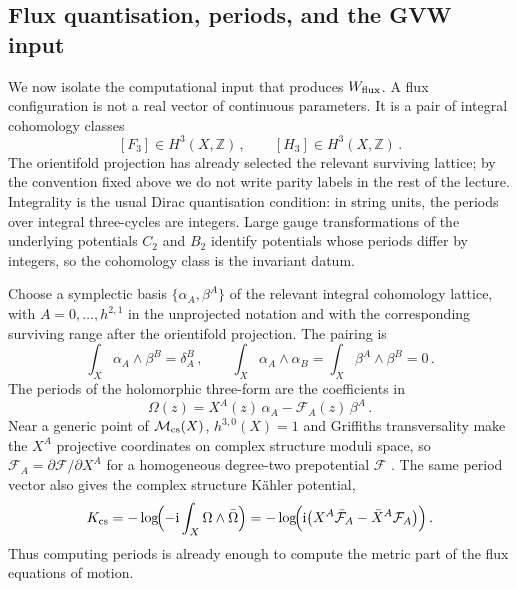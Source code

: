 \subsection{Flux quantisation, periods, and the GVW input}
\label{ssec:L2-flux-period-setup}\label{ssec:L2-periods}

We now isolate the computational input that produces $W_{\rm flux}$.
A flux configuration is not a real vector of continuous parameters. It
is a pair of integral cohomology classes
\begin{equation}\label{eq:flux-quant}
    [F_3]\in H^3(X,\mathbb Z)\, ,
    \qquad
    [H_3]\in H^3(X,\mathbb Z)\, .
\end{equation}
The orientifold projection has already selected the relevant surviving
lattice; by the convention fixed above we do not write parity labels
in the rest of the lecture.  Integrality is the usual Dirac
quantisation condition: in string units, the periods over integral
three-cycles are integers.  Large gauge transformations of the
underlying potentials $C_2$ and $B_2$ identify potentials whose
periods differ by integers, so the cohomology class is the invariant
datum.

Choose a symplectic basis $\{\alpha_A,\beta^A\}$ of the relevant
integral cohomology lattice, with $A=0,\ldots,h^{2,1}$ in the
unprojected notation and with the corresponding surviving range after
the orientifold projection.  The pairing is
\begin{equation}\label{eq:L2-symplectic-pairing}
    \int_X\alpha_A\wedge\beta^B
    =
    \delta_A^B\, ,
    \qquad
    \int_X\alpha_A\wedge\alpha_B
    =
    \int_X\beta^A\wedge\beta^B
    =
    0\, .
\end{equation}
The periods of the holomorphic three-form are the coefficients in
\begin{equation}\label{eq:periods}
    \Omega(z)
    =
    X^A(z)\,\alpha_A-\mathcal F_A(z)\,\beta^A\, .
\end{equation}
Near a generic point of $\mathcal M_{\rm cs}(X)$, $h^{3,0}(X)=1$
and Griffiths transversality make the $X^A$ projective coordinates on
complex structure moduli space, so
$\mathcal F_A=\partial\mathcal F/\partial X^A$ for a homogeneous
degree-two prepotential $\mathcal F$ \cite{Candelas:1990rm}.  The
same period vector also gives the complex structure K\"ahler
potential,
\begin{equation}\label{eq:K-cs}
    K_{\rm cs}
    =
    -\log\!\Bigl(-\mathrm{i}\int_X\Omega\wedge\bar\Omega\Bigr)
    =
    -\log\!\Bigl(\mathrm{i}\bigl(X^A\bar{\mathcal F}_A
    -\bar X^A\mathcal F_A\bigr)\Bigr)\, .
\end{equation}
Thus computing periods is already enough to compute the metric part of
the flux equations of motion.

